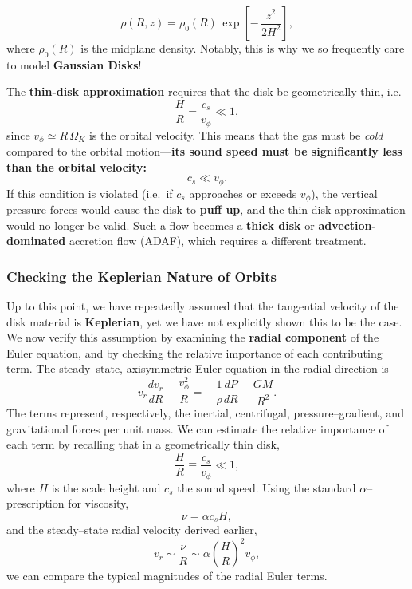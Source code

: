 \begin{equation}
\boxed{
\rho(R,z) = \rho_0(R)\,
\exp\!\left[-\,\frac{z^2}{2H^2}\right],
}
\end{equation}
where $\rho_0(R)$ is the midplane density. Notably, this is why we so frequently care to model \textbf{Gaussian Disks}!
\par
The \textbf{thin-disk approximation} requires that the disk be geometrically thin, i.e.
\begin{equation}
\frac{H}{R} = \frac{c_s}{v_\phi} \ll 1,
\end{equation}
since $v_\phi \simeq R\,\Omega_K$ is the orbital velocity.  This means that the gas must be \emph{cold} compared to the orbital motion—\textbf{its sound speed must be significantly less than the orbital velocity:}
\begin{equation}
\boxed{
c_s \ll v_\phi.
}
\end{equation}
If this condition is violated (i.e.\ if $c_s$ approaches or exceeds $v_\phi$), the vertical pressure forces would cause the disk to \textbf{puff up}, and the thin-disk approximation would no longer be valid. Such a flow becomes a \textbf{thick disk} or \textbf{advection-dominated} accretion flow (ADAF), which requires a different treatment.
\par
\subsubsection*{Checking the Keplerian Nature of Orbits}

Up to this point, we have repeatedly assumed that the tangential velocity of the disk material is \textbf{Keplerian}, yet we have not explicitly shown this to be the case.  We now verify this assumption by examining the \textbf{radial component} of the Euler equation, and by checking the relative importance of each contributing term. The steady--state, axisymmetric Euler equation in the radial direction is
\begin{equation}
v_r \frac{dv_r}{dR} - \frac{v_\phi^2}{R}
= -\,\frac{1}{\rho}\frac{dP}{dR} - \frac{GM}{R^2}.
\label{eq:radial_euler}
\end{equation}
The terms represent, respectively, the inertial, centrifugal, pressure--gradient, and gravitational forces per unit mass.  We can estimate the relative importance of each term by recalling that in a geometrically thin disk,
\[
\frac{H}{R} \equiv \frac{c_s}{v_\phi} \ll 1,
\]
where $H$ is the scale height and $c_s$ the sound speed. Using the standard $\alpha$--prescription for viscosity,
\[
\nu = \alpha c_s H,
\]
and the steady--state radial velocity derived earlier,
\[
v_r \sim \frac{\nu}{R} \sim \alpha \left(\frac{H}{R}\right)^2 v_\phi,
\]
we can compare the typical magnitudes of the radial Euler terms.

